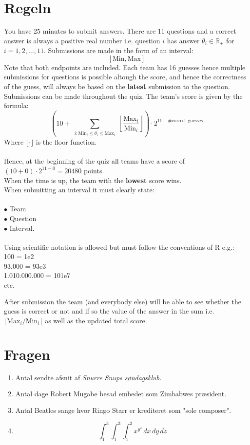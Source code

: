 \documentclass[10pt,a4paper]{article}
\begin{document}
 
\section*{Regeln}
You have 25 minutes to submit answers. There are 11 questions and a correct answer is always a positive real number i.e. question $i$ has answer $\theta_i \in \mathbb{R}_+$ for $i = 1,2,\ldots,11$. Submissions are made in the form of an interval:
$$
[\text{Min}, \text{Max}]
$$
Note that both endpoints are included. Each team has 16 guesses hence multiple submissions for questions is possible altough the score, and hence the correctness of the guess, will always be based on the \textbf{latest} submission to the question.
Submissions can be made throughout the quiz. 
The team's score is given by the formula:
$$
\left( 10 + \sum_{\substack{i : \text{Min}_i \leq \theta_i \leq \text{Max}_i}} \left\lfloor \frac{\text{Max}_i}{\text{Min}_i} \right\rfloor \right) \cdot 2^{11 - \# \text{correct guesses} }
$$
Where $\lfloor \cdot \rfloor$ is the floor function.\\ \\
Hence, at the beginning of the quiz all teams have a score of
$(10 + 0)\cdot 2^{11-0} = 20480$ points. \\
When the time is up, the team with the \textbf{lowest} score wins.\\
When submitting an interval it must clearly state:\\ \\
$\bullet$ Team\\
$\bullet$ Question\\
$\bullet$ Interval. \\ \\
Using scientific notation is allowed but must follow the conventions of R e.g.:\\
100 = 1e2 \\
93.000 = 93e3 \\
1.010.000.000 = 101e7 \\
etc.

After submission the team (and everybody else) will be able to see whether the guess is correct or not and if so the value of the answer in the sum i.e. $\lfloor \text{Max}_i / \text{Min}_i \rfloor$ as well as the updated total score.

\newpage
\section*{Fragen}
\begin{enumerate}
  \item Antal sendte afsnit af \textit{Snurre Snups søndagsklub.}
  
 \item Antal dage Robert Mugabe besad embedet som Zimbabwes præsident.

  \item Antal Beatles sange hvor Ringo Starr er krediteret som "sole composer".

  \item 
  $$
  \int_{1}^{3}\int_{1}^{3}\int_{1}^{3} x^{y^z}\,dx\,dy\,dz
  $$ 
 

\end{enumerate}
\end{document}
